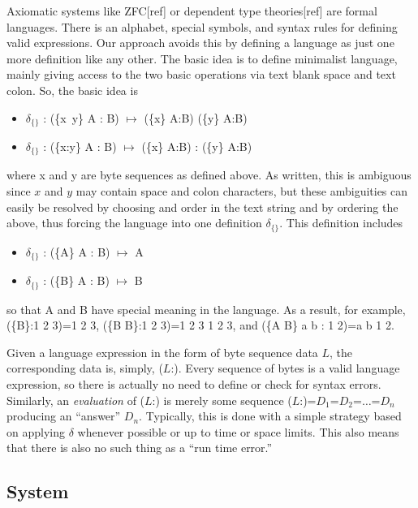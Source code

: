 \documentclass[11pt]{article}
\begin{document}
Axiomatic systems like ZFC[ref] or dependent type theories[ref] are formal languages.  There is an alphabet, special symbols, and syntax rules 
for defining valid expressions.  Our approach avoids this by defining a language as just one more definition like any other.  The basic idea is to 
define minimalist language, mainly giving access to the two basic operations via text blank space and text colon.  So, the basic idea is 
\begin{itemize}
\item {$\delta_{\{\}}$ : (\{x\ y\} A : B) $\mapsto$ (\{x\} A:B) (\{y\} A:B)}
\item {$\delta_{\{\}}$ : (\{x:y\} A : B) $\mapsto$ (\{x\} A:B) : (\{y\} A:B)}
\end{itemize}
where x and y are byte sequences as defined above.  As written, this is ambiguous since $x$ and $y$ may contain space and colon characters, but 
these ambiguities can easily be resolved by choosing and order in the text string and by ordering the above, thus forcing the language into one definition 
$\delta_{\{\}}$.  This definition includes 
\begin{itemize}
\item {$\delta_{\{\}}$ : (\{A\} A : B) $\mapsto$ A}
\item {$\delta_{\{\}}$ : (\{B\} A : B) $\mapsto$ B}
\end{itemize}
so that A and B have special meaning in the language.  As a result, for example, (\{B\}:1 2 3)=1 2 3, (\{B B\}:1 2 3)=1 2 3 1 2 3, and (\{A B\} a b : 1 2)=a b 1 2.  

     Given a language expression in the form of byte sequence data $L$, the corresponding data is, simply, ($L$:).  Every sequence of bytes is a valid language 
expression, so there is actually no need to define or check for syntax errors.  Similarly, an {\it evaluation} of ($L$:) is merely some sequence 
($L$:)=$D_1$=$D_2$=$\dots$=$D_n$ producing an ``answer'' $D_n$.  Typically, this is done with a simple strategy based on applying $\delta$ whenever 
possible or up to time or space limits.  This also means that there is also no such thing as a ``run time error.''    

\subsection{System} 
\end{document}
